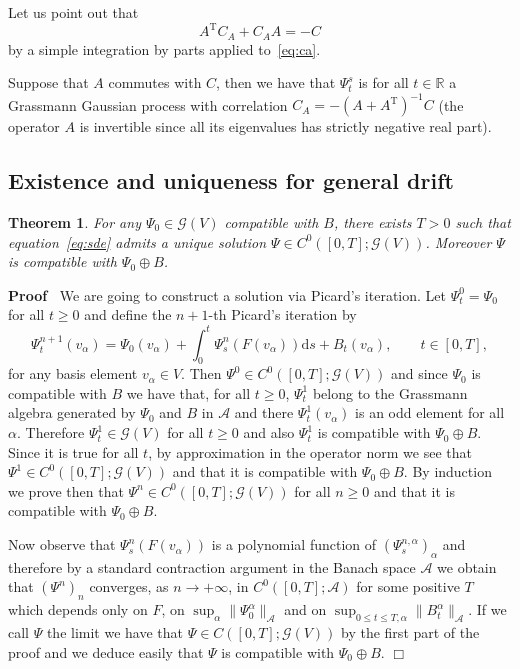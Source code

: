 \documentclass{article}
\newcommand{\Tau}{\mathrm{T}}
\newcommand{\mathd}{\mathrm{d}}
\newenvironment{proof}{\noindent\textbf{Proof\ }}{\hspace*{\fill}$\Box$\medskip}
\newtheorem{theorem}{Theorem}
\begin{document}
Let us point out that
\begin{equation}
  A^{\Tau} C_A + C_A A = - C \label{eq:relation-ca}
\end{equation}
by a simple integration by parts applied to~{\eqref{eq:ca}}.

\begin{remark}
  Suppose that $A$ commutes with $C$, then we have that $\Psi_t^s$ is for all
  $t \in \mathbb{R}$ a Grassmann Gaussian process with correlation $C_A = - (A
  + A^{\Tau})^{- 1} C$ (the operator $A$ is invertible since all its
  eigenvalues has strictly negative real part).
\end{remark}

\subsection{Existence and uniqueness for general drift}

\begin{theorem}
  \label{theorem_picard}For any $\Psi_0 \in \mathcal{G} (V)$ compatible with
  $B$, there exists $T > 0$ such that equation~{\eqref{eq:sde}} admits a
  unique solution $\Psi \in C^0 ([0, T] ; \mathcal{G} (V))$. Moreover $\Psi$
  is compatible with $\Psi_0 \oplus B$.
\end{theorem}

\begin{proof}
  We are going to construct a solution via Picard's iteration. Let $\Psi^0_t =
  \Psi_0$ for all $t \geqslant 0$ and define the $n + 1$-th Picard's iteration
  by
  \[ \Psi_t^{n + 1} (v_{\alpha}) = \Psi_0 (v_{\alpha}) + \int_0^t \Psi_s^n (F
     (v_{\alpha})) \mathd s + B_t (v_{\alpha}), \qquad t \in [0, T], \]
  for any basis element $v_{\alpha} \in V$. Then $\Psi^0 \in C^0 ([0, T] ;
  \mathcal{G} (V))$ and since $\Psi_0$ is compatible with $B$ we have that,
  for all $t \geqslant 0$, $\Psi^1_t$ belong to the Grassmann algebra
  generated by $\Psi_0$ and $B$ in $\mathcal{A}$ and there $\Psi^1_t
  (v_{\alpha})$ is an odd element for all $\alpha$. Therefore $\Psi^1_t \in
  \mathcal{G} (V)$ for all $t \geqslant 0$ and also $\Psi^1_t$ is compatible
  with $\Psi_0 \oplus B$. Since it is true for all $t$, by approximation in
  the operator norm we see that $\Psi^1 \in C^0 ([0, T] ; \mathcal{G} (V))$
  and that it is compatible with $\Psi_0 \oplus B$. By induction we prove then
  that $\Psi^n \in C^0 ([0, T] ; \mathcal{G} (V))$ for all $n \geqslant 0$ and
  that it is compatible with $\Psi_0 \oplus B$.
  
  Now observe that $\Psi_s^n (F (v_{\alpha}))$ is a polynomial function of
  $(\Psi^{n, \alpha}_s)_{\alpha}$ and therefore by a standard contraction
  argument in the Banach space $\mathcal{A}$ we obtain that $(\Psi^n)_n$
  converges, as $n \rightarrow + \infty$, in $C^0 ([0, T] ; \mathcal{A})$ for
  some positive $T$ which depends only on $F$, on $\sup_{\alpha} \|
  \Psi_0^{\alpha} \|_{\mathcal{A}}$ and on $\sup_{0 \leqslant t \leqslant T,
  \alpha} \| B_t^{\alpha} \|_{\mathcal{A}}$. If we call $\Psi$ the limit we
  have that $\Psi \in C ([0, T] ; \mathcal{G} (V))$ by the first part of the
  proof and we deduce easily that $\Psi$ is compatible with $\Psi_0 \oplus B$.
\end{proof}
\end{document}
